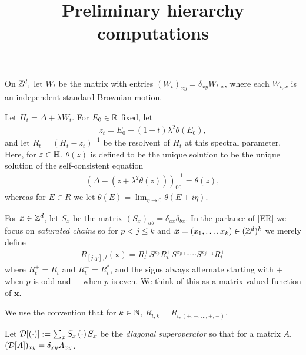 


\newcommand{\bs}{\boldsymbol}


\title{Preliminary hierarchy computations}


\maketitle

On ${\mathbb{Z}}^{d},$ let $W_t$ be the matrix with entries $(W_t)_{xy} = \delta_{xy} W_{t,x}$, where each $W_{t,x}$ is an independent standard Brownian motion.

Let $H_t = \Delta + \lambda W_t$. For $E_0 \in  {\mathbb{R}}$ fixed, let
\begin{align*}
z_t = E_0  + (1-t) \lambda^{2} \theta(E_0),
\end{align*}
and let $R_t = (H_t - z_t)^{-1}$ be the resolvent of $H_t$ at this spectral parameter.
Here, for $z\in {\mathbb H}$, $\theta(z)$ is defined to be the unique solution to be the unique solution of the self-consistent equation
\begin{align*}
\left(\Delta  - (z  + \lambda^{2} \theta(z)) \right)^{-1}_{00} = \theta(z),
\end{align*}
whereas for $E \in R$ we let $\theta(E) = \lim_{\eta \to 0}\theta(E+ i\eta)$.

For $x\in  {\mathbb{Z}}^{d}$, let $S_{x}$ be the matrix $(S_{x})_{ab} = \delta_{ax} \delta_{bx}$. 
In the parlance of [ER] we focus on \emph{saturated chains} so for $p<j\leq k$ and $\bs x = (x_1,\ldots,x_k) \in  (\bbZ^{d})^{k}$ we merely define
\begin{align*}
R_{[j,p],t}(\bs x)  = R_t^{\pm} S^{x_p} R_t^{\pm} S^{x_{p+1}} \cdots S^{x_{j-1}} R_t^{\pm}
\end{align*}
where $R_t^{+} = R_t$ and $R_t^{-} = R_t^{*}$, and the signs always alternate starting with $+$ when $p$ is odd and $-$ when $p$ is even. 
We think of this as a matrix-valued function of $\bs x$.

We use the convention that for $k \in {\mathbb N}$, $R_{t,k} =  R_{t,(+,-,\ldots,+,-)}$.

Let  $\mathcal{D}[\left( \cdot \right)]:= \sum_{x} S_x \left( \cdot \right)  S_x$ be the \emph{diagonal superoperator} so that for a matrix $A$, $(\mathcal{D}[A])_{xy} = \delta_{xy} A_{xy}$.

